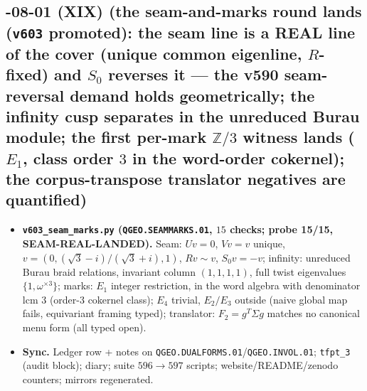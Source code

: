\documentclass[11pt]{article}
\begin{document}
\subsection*{-08-01 (XIX) (the seam-and-marks round lands (\texttt{v603} promoted): the seam line is a REAL line of the cover (unique common eigenline, $R$-fixed) and $S_0$ reverses it --- the v590 seam-reversal demand holds geometrically; the infinity cusp separates in the unreduced Burau module; the first per-mark $\mathbb{Z}/3$ witness lands ($E_1$, class order $3$ in the word-order cokernel); the corpus-transpose translator negatives are quantified)}
\begin{itemize}[leftmargin=1.5em]
\item \textbf{\texttt{v603\_seam\_marks.py} (\texttt{QGEO.SEAMMARKS.01}, $15$ checks; probe
15/15, SEAM-REAL-LANDED).} Seam: $Uv=0$, $Vv=v$ unique, $v=(0,(\sqrt3-i)/(\sqrt3+i),1)$,
$Rv\sim v$, $S_0v=-v$; infinity: unreduced Burau braid relations, invariant column
$(1,1,1,1)$, full twist eigenvalues $\{1,\omega^{\times3}\}$; marks: $E_1$ integer
restriction, in the word algebra with denominator lcm $3$ (order-$3$ cokernel class);
$E_4$ trivial, $E_2/E_3$ outside (naive global map fails, equivariant framing typed);
translator: $F_2=g^T\Sigma g$ matches no canonical menu form (all typed open).
\item \textbf{Sync.} Ledger row + notes on
\texttt{QGEO.DUALFORMS.01}/\texttt{QGEO.INVOL.01}; \texttt{tfpt\_3} (audit block); diary;
suite $596\to597$ scripts; website/README/zenodo counters; mirrors regenerated.
\end{itemize}
\end{document}
